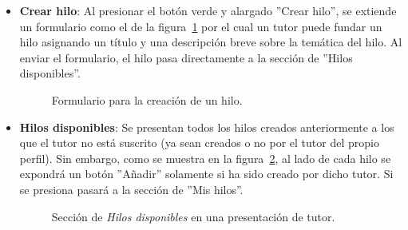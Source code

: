 \documentclass[a4paper, 12pt]{book}
\begin{document}
\begin{itemize}
  \item {\bfseries Crear hilo}: Al presionar el bot\'on verde y alargado ''Crear hilo'', se extiende un formulario como el de la figura~\ref{figura:tutor1} 
  por el cual un tutor puede fundar un hilo asignando un t\'itulo y una descripci\'on breve sobre la tem\'atica del hilo. Al enviar el formulario, el hilo 
  pasa directamente a la secci\'on de ''Hilos disponibles''.
  \begin{figure}[htbp] 
    \centering
    \caption{Formulario para la creaci\'on de un hilo.}
    \label{figura:tutor1}
  \end{figure}
  
  \item {\bfseries Hilos disponibles}: Se presentan todos los hilos creados anteriormente a los que el tutor no est\'a suscrito (ya sean creados o no por 
  el tutor del propio perfil). Sin embargo, como se muestra en la figura~\ref{figura:tutor2}, al lado de cada hilo se expondr\'a un bot\'on ''A\~nadir'' 
  solamente si ha sido creado por dicho tutor. Si se presiona pasar\'a a la secci\'on de ''Mis hilos''.
  \begin{figure}[htbp] 
    \centering
    \caption{Secci\'on de \textit{Hilos disponibles} en una presentaci\'on de tutor.}
    \label{figura:tutor2}
  \end{figure}
  

\end{itemize}
\end{document}
